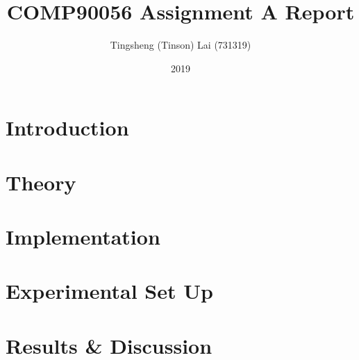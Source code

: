 \documentclass[a4paper]{article}
\title{\textbf{COMP90056 Assignment A Report}}
\author{Tingsheng (Tinson) Lai (731319)}
\date{2019}
\begin{document}
    \maketitle
    \section{Introduction}
    \section{Theory}
    \section{Implementation}
    \section{Experimental Set Up}
    \section{Results \& Discussion}
\end{document}
